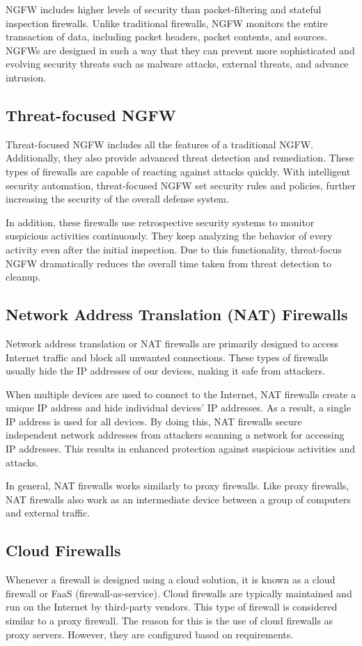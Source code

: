 \documentclass[a4paper,12pt]{book}
\begin{document}
NGFW includes higher levels of security than packet-filtering and stateful inspection firewalls. Unlike traditional firewalls, NGFW monitors the entire transaction of data, including packet headers, packet contents, and sources. NGFWs are designed in such a way that they can prevent more sophisticated and evolving security threats such as malware attacks, external threats, and advance intrusion.
\subsection{Threat-focused NGFW}
Threat-focused NGFW includes all the features of a traditional NGFW. Additionally, they also provide advanced threat detection and remediation. These types of firewalls are capable of reacting against attacks quickly. With intelligent security automation, threat-focused NGFW set security rules and policies, further increasing the security of the overall defense system.

In addition, these firewalls use retrospective security systems to monitor suspicious activities continuously. They keep analyzing the behavior of every activity even after the initial inspection. Due to this functionality, threat-focus NGFW dramatically reduces the overall time taken from threat detection to cleanup.
\subsection{Network Address Translation (NAT) Firewalls}
Network address translation or NAT firewalls are primarily designed to access Internet traffic and block all unwanted connections. These types of firewalls usually hide the IP addresses of our devices, making it safe from attackers.


When multiple devices are used to connect to the Internet, NAT firewalls create a unique IP address and hide individual devices' IP addresses. As a result, a single IP address is used for all devices. By doing this, NAT firewalls secure independent network addresses from attackers scanning a network for accessing IP addresses. This results in enhanced protection against suspicious activities and attacks.

In general, NAT firewalls works similarly to proxy firewalls. Like proxy firewalls, NAT firewalls also work as an intermediate device between a group of computers and external traffic.


\subsection{Cloud Firewalls}
Whenever a firewall is designed using a cloud solution, it is known as a cloud firewall or FaaS (firewall-as-service). Cloud firewalls are typically maintained and run on the Internet by third-party vendors. This type of firewall is considered similar to a proxy firewall. The reason for this is the use of cloud firewalls as proxy servers. However, they are configured based on requirements.
\end{document}
